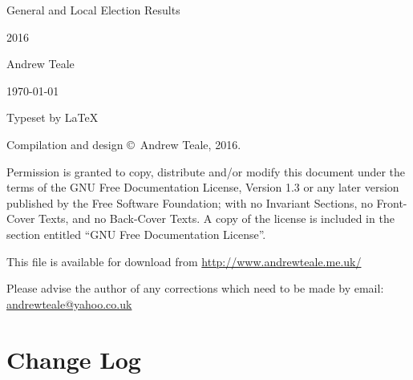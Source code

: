 \documentclass[a4paper,openany]{book}
\begin{document}

\begin{titlepage}

\begin{center}

\Huge General and Local Election Results

2016

\bigskip

\Large Andrew Teale

\vfill

\newcommand\versionno{0.10.1}


\today

\end{center}

\end{titlepage}


\begin{center}

\bigskip

Typeset by \LaTeX{} 

\bigskip

Compilation and design \copyright\ Andrew Teale, 2016.

 Permission is granted to copy, distribute and/or modify this document
 under the terms of the GNU Free Documentation License, Version 1.3
 or any later version published by the Free Software Foundation;
 with no Invariant Sections, no Front-Cover Texts, and no Back-Cover Texts.
 A copy of the license is included in the section entitled ``GNU
 Free Documentation License''.

\bigskip

This file is available for download from
\url{http://www.andrewteale.me.uk/}

\bigskip

Please advise the author of any corrections which need to be made by
email: \url{andrewteale@yahoo.co.uk}

\vfill
\end{center}

\section*{Change Log}


%
\end{document}
